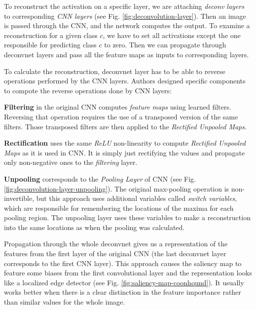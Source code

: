 \vspace{\baselineskip}

To reconstruct the activation on a specific layer, we are attaching \textit{deconv layers} to corresponding \textit{CNN layers} (see Fig. \ref{fig:deconvolution-layer}). Then an image is passed through the CNN, and the network computes the output. To examine a reconstruction for a given class $c$, we have to set all activations except the one responsible for predicting class $c$ to zero. Then we can propagate through deconvnet layers and pass all the feature maps as inputs to corresponding layers.

\vspace{\baselineskip}

To calculate the reconstruction, deconvnet layer has to be able to reverse operations performed by the CNN layers. Authors designed specific components to compote the reverse operations done by CNN layers:

\vspace{\baselineskip}

\textbf{Filtering} in the original CNN computes \textit{feature maps} using learned filters. Reversing that operation requires the use of a transposed version of the same filters. Those transposed filters are then applied to the \textit{Rectified Unpooled Maps}.

\vspace{\baselineskip}


\textbf{Rectification} uses the same \textit{ReLU} non-linearity \cite{hahnloser2000digital} to compute \textit{Rectified Unpooled Maps} as it is used in CNN. It is simply just rectifying the values and propagate only non-negative ones to the \textit{filtering} layer.

\vspace{\baselineskip}

\textbf{Unpooling} corresponds to the \textit{Pooling Layer} of CNN (see Fig. \ref{fig:deconvolution-layer-unpooling}). The original max-pooling operation is non-invertible, but this approach uses additional variables called \textit{switch variables}, which are responsible for remembering the locations of the maxima for each pooling region. The unpooling layer uses these variables to make a reconstruction into the same locations as when the pooling was calculated.

\vspace{\baselineskip}

Propagation through the whole deconvnet gives us a representation of the features from the first layer of the original CNN (the last deconvnet layer corresponds to the first CNN layer). This approach causes the saliency map to feature some biases from the first convolutional layer and the representation looks like a localized edge detector (see Fig. \ref{fig:saliency-map-coonhound}). It usually works better when there is a clear distinction in the feature importance rather than similar values for the whole image.